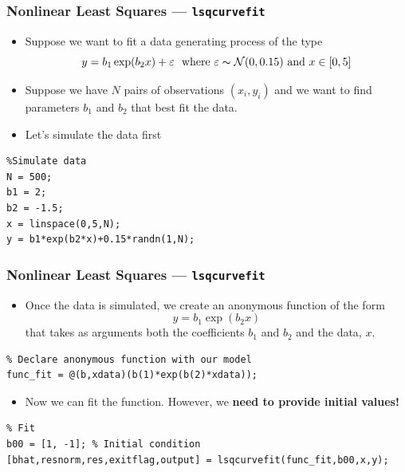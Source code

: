 \documentclass[11pt,xcolor={svgnames},aspectratio=169,usepdftitle=false,notheorems]{beamer}
\begin{document}
\begin{frame}[fragile]
  \frametitle{Nonlinear Least Squares --- \texttt{lsqcurvefit}}
  \begin{itemize}
    \item Suppose we want to fit a data generating process of the type
    \[
    y = b_1 \exp(b_2 x) + \varepsilon \ \text{ where } \varepsilon \thicksim \mathcal{N}(0,0.15) \text{ and } x\in [0,5]
    \]
    \item Suppose we have $N$ pairs of observations $(x_i,y_i)$ and we want to find parameters $b_1$ and $b_2$ that best fit the data.
    \item Let's simulate the data first
  \end{itemize}
\begin{lstlisting}
%Simulate data
N = 500;
b1 = 2;
b2 = -1.5;
x = linspace(0,5,N);
y = b1*exp(b2*x)+0.15*randn(1,N);
\end{lstlisting}
\end{frame}

\begin{frame}[fragile]
  \frametitle{Nonlinear Least Squares --- \texttt{lsqcurvefit}}
\begin{itemize}
  \item Once the data is simulated, we create an anonymous function of the form
  \[
  y = b_1\exp(b_2 x)  
  \]
  that takes as arguments both the coefficients $b_1$ and $b_2$ and the data, $x$.
\end{itemize}
\begin{lstlisting}
% Declare anonymous function with our model
func_fit = @(b,xdata)(b(1)*exp(b(2)*xdata));
\end{lstlisting}
\begin{itemize}
  \item Now we can fit the function. However, we \alert{\textbf{need to provide initial values!}}
\end{itemize}
\begin{lstlisting}
% Fit
b00 = [1, -1]; % Initial condition
[bhat,resnorm,res,exitflag,output] = lsqcurvefit(func_fit,b00,x,y);
\end{lstlisting}
\end{frame}
\end{document}
